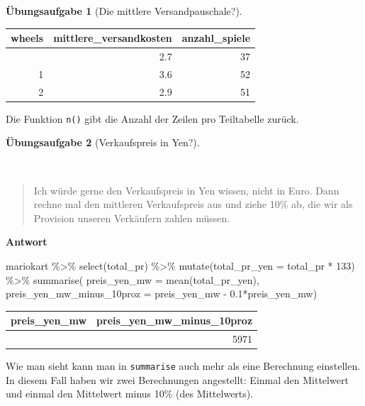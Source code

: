 \documentclass[
  a4paper,
]{scrbook}
\newenvironment{Shaded}{\begin{snugshade}}{\end{snugshade}}
\newcommand{\AttributeTok}[1]{\textcolor[rgb]{0.40,0.45,0.13}{#1}}
\newcommand{\DecValTok}[1]{\textcolor[rgb]{0.68,0.00,0.00}{#1}}
\newcommand{\FloatTok}[1]{\textcolor[rgb]{0.68,0.00,0.00}{#1}}
\newcommand{\FunctionTok}[1]{\textcolor[rgb]{0.28,0.35,0.67}{#1}}
\newcommand{\NormalTok}[1]{\textcolor[rgb]{0.00,0.23,0.31}{#1}}
\newcommand{\SpecialCharTok}[1]{\textcolor[rgb]{0.37,0.37,0.37}{#1}}
\theoremstyle{definition}
\theoremstyle{definition}
\theoremstyle{definition}
\newtheorem{exercise}{Übungsaufgabe}[chapter]
\theoremstyle{remark}
\begin{document}
\begin{exercise}[Die mittlere
Versandpauschale?]
\begin{longtable}[]{@{}rrr@{}}
\toprule\noalign{}
wheels & mittlere\_versandkosten & anzahl\_spiele \\
\midrule\noalign{}
\endhead
\bottomrule\noalign{}
\endlastfoot
0 & 2.7 & 37 \\
1 & 3.6 & 52 \\
2 & 2.9 & 51 \\
\end{longtable}

Die Funktion \texttt{n()} gibt die Anzahl der Zeilen pro Teiltabelle
zurück.

\end{exercise}

\begin{exercise}[Verkaufspreis in
Yen?]\protect\hypertarget{exr-Forschungsfrage3}{}\label{exr-Forschungsfrage3}

~

\begin{quote}
{} Ich würde gerne den Verkaufspreis in Yen wissen, nicht
in Euro. Dann rechne mal den mittleren Verkaufspreis aus und ziehe 10\%
ab, die wir als Provision unseren Verkäufern zahlen müssen.
\end{quote}

\textbf{Antwort}

\begin{Shaded}
\begin{Highlighting}[]
\NormalTok{mariokart }\SpecialCharTok{\%\textgreater{}\%} 
  \FunctionTok{select}\NormalTok{(total\_pr) }\SpecialCharTok{\%\textgreater{}\%} 
  \FunctionTok{mutate}\NormalTok{(}\AttributeTok{total\_pr\_yen =}\NormalTok{ total\_pr }\SpecialCharTok{*} \DecValTok{133}\NormalTok{) }\SpecialCharTok{\%\textgreater{}\%} 
  \FunctionTok{summarise}\NormalTok{(}
    \AttributeTok{preis\_yen\_mw =} \FunctionTok{mean}\NormalTok{(total\_pr\_yen),}
    \AttributeTok{preis\_yen\_mw\_minus\_10proz =}\NormalTok{ preis\_yen\_mw }\SpecialCharTok{{-}} \FloatTok{0.1}\SpecialCharTok{*}\NormalTok{preis\_yen\_mw)}
\end{Highlighting}
\end{Shaded}

\begin{longtable}[]{@{}rr@{}}
\toprule\noalign{}
preis\_yen\_mw & preis\_yen\_mw\_minus\_10proz \\
\midrule\noalign{}
\endhead
\bottomrule\noalign{}
\endlastfoot
6634 & 5971 \\
\end{longtable}

Wie man sieht kann man in \texttt{summarise} auch mehr als eine
Berechnung einstellen. In diesem Fall haben wir zwei Berechnungen
angestellt: Einmal den Mittelwert und einmal den Mittelwert minus 10\%
(des Mittelwerts).

\end{exercise}
\end{document}

